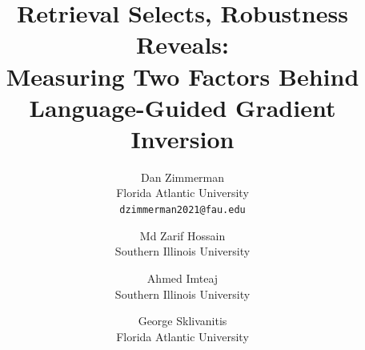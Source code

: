 \documentclass[10pt,twocolumn,letterpaper]{article}
\title{Retrieval Selects, Robustness Reveals:\\Measuring Two Factors Behind Language-Guided Gradient Inversion}
\author{Dan Zimmerman\\
Florida Atlantic University\\
{\tt\small dzimmerman2021@fau.edu}
\and
Md Zarif Hossain\\
Southern Illinois University\\
\and
Ahmed Imteaj\\
Southern Illinois University\\
\and
George Sklivanitis\\
Florida Atlantic University\\
}
\begin{document}
\maketitle









{
    \small
    
    
}

% 
\end{document}
